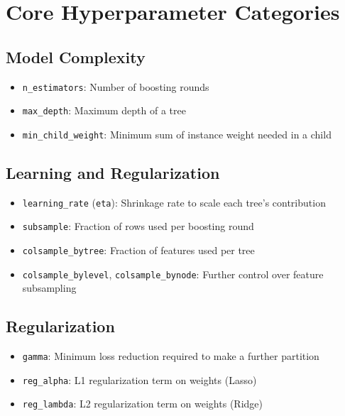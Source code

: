 \documentclass[
  letterpaper,
  DIV=11,
  numbers=noendperiod]{scrreprt}
\providecommand{\tightlist}{%
  \setlength{\itemsep}{0pt}\setlength{\parskip}{0pt}}\usepackage{longtable,booktabs,array}
\begin{document}
\section{Core Hyperparameter
Categories}\label{core-hyperparameter-categories}

\subsection{Model Complexity}\label{model-complexity}

\begin{itemize}
\tightlist
\item
  \texttt{n\_estimators}: Number of boosting rounds\\
\item
  \texttt{max\_depth}: Maximum depth of a tree\\
\item
  \texttt{min\_child\_weight}: Minimum sum of instance weight needed in
  a child
\end{itemize}

\subsection{Learning and
Regularization}\label{learning-and-regularization}

\begin{itemize}
\tightlist
\item
  \texttt{learning\_rate} (\texttt{eta}): Shrinkage rate to scale each
  tree's contribution\\
\item
  \texttt{subsample}: Fraction of rows used per boosting round\\
\item
  \texttt{colsample\_bytree}: Fraction of features used per tree\\
\item
  \texttt{colsample\_bylevel}, \texttt{colsample\_bynode}: Further
  control over feature subsampling
\end{itemize}

\subsection{Regularization}\label{regularization}

\begin{itemize}
\tightlist
\item
  \texttt{gamma}: Minimum loss reduction required to make a further
  partition\\
\item
  \texttt{reg\_alpha}: L1 regularization term on weights (Lasso)\\
\item
  \texttt{reg\_lambda}: L2 regularization term on weights (Ridge)
\end{itemize}
\end{document}
